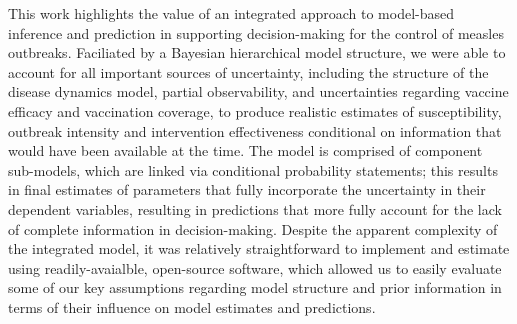 This work highlights the value of an integrated approach to model-based inference and prediction in supporting decision-making for the control of measles outbreaks. Faciliated by a Bayesian hierarchical model structure, we were able to account for all important sources of uncertainty, including the structure of the disease dynamics model, partial observability, and uncertainties regarding vaccine efficacy and vaccination coverage, to produce realistic estimates of susceptibility, outbreak intensity and intervention effectiveness conditional on information that would have been available at the time. The model is comprised of component sub-models, which are linked via conditional probability statements; this results in final estimates of parameters that fully incorporate the uncertainty in their dependent variables, resulting in predictions that more fully account for the lack of complete information in decision-making. Despite the apparent complexity of the integrated model, it was relatively straightforward to implement and estimate using readily-avaialble, open-source software, which allowed us to easily evaluate some of our key assumptions regarding model structure and prior information in terms of their influence on model estimates and predictions. 

